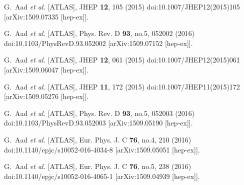 \begin{thebibliography}{9}
G.~Aad \textit{et al.} [ATLAS],
JHEP \textbf{12}, 105 (2015)
doi:10.1007/JHEP12(2015)105
[arXiv:1509.07335 [hep-ex]].

G.~Aad \textit{et al.} [ATLAS],
Phys. Rev. D \textbf{93}, no.5, 052002 (2016)
doi:10.1103/PhysRevD.93.052002
[arXiv:1509.07152 [hep-ex]].

G.~Aad \textit{et al.} [ATLAS],
JHEP \textbf{12}, 061 (2015)
doi:10.1007/JHEP12(2015)061
[arXiv:1509.06047 [hep-ex]].

G.~Aad \textit{et al.} [ATLAS],
JHEP \textbf{11}, 172 (2015)
doi:10.1007/JHEP11(2015)172
[arXiv:1509.05276 [hep-ex]].

G.~Aad \textit{et al.} [ATLAS],
Phys. Rev. D \textbf{93}, no.5, 052003 (2016)
doi:10.1103/PhysRevD.93.052003
[arXiv:1509.05190 [hep-ex]].

G.~Aad \textit{et al.} [ATLAS],
Eur. Phys. J. C \textbf{76}, no.4, 210 (2016)
doi:10.1140/epjc/s10052-016-4034-8
[arXiv:1509.05051 [hep-ex]].

G.~Aad \textit{et al.} [ATLAS],
Eur. Phys. J. C \textbf{76}, no.5, 238 (2016)
doi:10.1140/epjc/s10052-016-4065-1
[arXiv:1509.04939 [hep-ex]].


\end{thebibliography}
